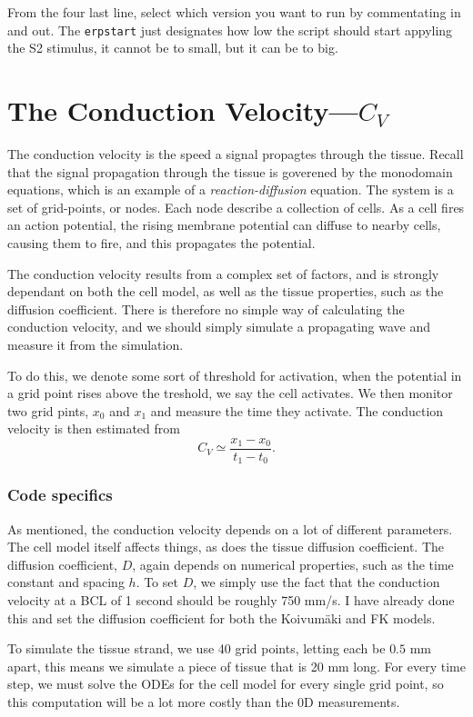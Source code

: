 \documentclass[a4paper, 11pt, notitlepage, english]{article}
\begin{document}
From the four last line, select which version you want to run by commentating in and out. The \verb+erpstart+ just designates how low the script should start appyling the S2 stimulus, it cannot be to small, but it can be to big.

\section*{The Conduction Velocity---$C_V$}

The conduction velocity is the speed a signal propagtes through the tissue. Recall that the signal propagation through the tissue is goverened by the monodomain equations, which is an example of a \emph{reaction-diffusion} equation. The system is a set of grid-points, or nodes. Each node describe a collection of cells. As a cell fires an action potential, the rising membrane potential can diffuse to nearby cells, causing them to fire, and this propagates the potential.

The conduction velocity results from a complex set of factors, and is strongly dependant on both the cell model, as well as the tissue properties, such as the diffusion coefficient. There is therefore no simple way of calculating the conduction velocity, and we should simply simulate a propagating wave and measure it from the simulation.

To do this, we denote some sort of threshold for activation, when the potential in a grid point rises above the treshold, we say the cell activates. We then monitor two grid pints, $x_0$ and $x_1$ and measure the time they activate. The conduction velocity is then estimated from
$$C_V \simeq \frac{x_1 - x_0}{t_1 - t_0}.$$

\subsubsection*{Code specifics}

As mentioned, the conduction velocity depends on a lot of different parameters. The cell model itself affects things, as does the tissue diffusion coefficient. The diffusion coefficient, $D$, again depends on numerical properties, such as the time constant and spacing $h$. To set $D$, we simply use the fact that the conduction velocity at a BCL of 1 second should be roughly 750 mm/s. I have already done this and set the diffusion coefficient for both the Koivumäki and FK models.


To simulate the tissue strand, we use 40 grid points, letting each be $0.5$ mm apart, this means we simulate a piece of tissue that is 20 mm long. For every time step, we must solve the ODEs for the cell model for every single grid point, so this computation will be a lot more costly than the 0D measurements.
\end{document}
